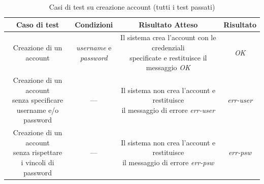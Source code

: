 \begin{table}[h!]
\centering
\begin{tabular}{|c|c|c|c|}
\hline
\multicolumn{1}{|c|}{\textbf{Caso di test}} & \multicolumn{1}{c|}{\textbf{Condizioni}} & \multicolumn{1}{|c|}{\textbf{Risultato Atteso}} & \multicolumn{1}{|c|}{\textbf{Risultato}}\\ \hline
Creazione di un account & \makecell{\textit{username} e\\ \textit{password}} &  \makecell{Il sistema crea l'account con le credenziali\\specificate e restituisce il messaggio \textit{OK}} &  \textit{OK} \\ \hline
\makecell{Creazione di un account\\senza specificare\\username e/o password} & --- & \makecell{Il sistema non crea l'account e restituisce\\il messaggio di errore \textit{err-user}} &  \textit{err-user} \\ \hline
\makecell{Creazione di un account\\senza rispettare\\i vincoli di password } & --- & \makecell{Il sistema non crea l'account e restituisce\\il messaggio di errore \textit{err-psw}} &  \textit{err-psw} \\ \hline

\end{tabular}
\caption{Casi di test su creazione account (tutti i test passati)}
\label{}
\end{table}

